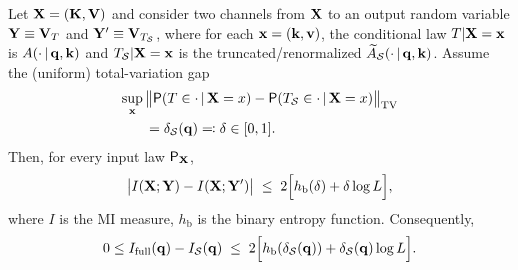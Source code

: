 \begin{lemma}
\label{lem:continuity}
Let $\mathbf{X}=(\mathbf{K},\mathbf{V})$ and consider two channels from $\mathbf{X}$ to an output random variable $\mathbf{Y} \equiv \mathbf{V}_T$ and $\mathbf{Y}' \equiv \mathbf{V}_{T_{\mathcal S}}$, where for each $\mathbf{x}=(\mathbf{k},\mathbf{v})$, the conditional law $T|\mathbf{X}=\mathbf{x}$ is $A(\cdot\,|\,\mathbf{q},\mathbf{k})$ and
$T_{\mathcal S}|\mathbf{X}=\mathbf{x}$ is the truncated/renormalized $\widetilde A_{\mathcal S}(\cdot\,|\,\mathbf{q},\mathbf{k})$.
Assume the (uniform) total-variation gap
\begin{align}
    \sup_{\mathbf{x}}\, &\big\| \mathsf P(T\in\cdot\,|\,\mathbf{X}=x)-\mathsf P(T_{\mathcal S}\in\cdot\,|\,\mathbf{X}=x)\big\|_{\mathrm{TV}} \nonumber \\
    &=\delta_{\mathcal S}(\mathbf{q})\eqqcolon \delta \in[0,1].
\end{align}
Then, for every input law $\mathsf P_{\mathbf{X}}$,
\[
\big|I(\mathbf{X};\mathbf{Y})-I(\mathbf{X};\mathbf{Y}')\big|
\;\le\;
2\Big[h_{\mathrm b}(\delta)+\delta\log L\Big],
\]
where $I$ is the MI measure, $h_{\mathrm b}$ is the binary entropy function. Consequently,
\[
0\le I_{\mathrm{full}}(\mathbf{q})-I_{\mathcal S}(\mathbf{q})
\;\le\;
2\Big[h_{\mathrm b}(\delta_{\mathcal S}(\mathbf{q}))+\delta_{\mathcal S}(\mathbf{q})\log L\Big].
\]
\end{lemma}
